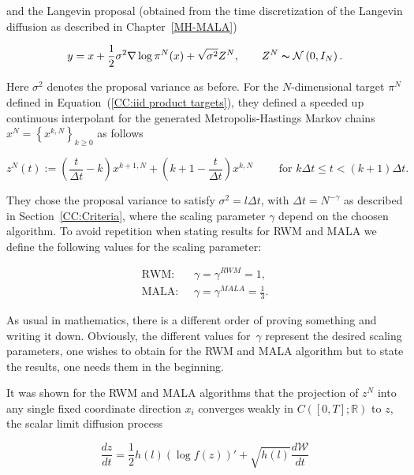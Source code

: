 and the Langevin proposal (obtained from the time discretization of the Langevin diffusion as described in Chapter~\ref{MH-MALA})

\begin{equation}
 \label{CC:MALAProposals}
 y = x + \frac{1}{2} \sigma^2 \nabla \log \pi^{N} (x) + \sqrt{\sigma^2} Z^N, \qquad Z^{N} \thicksim \mathcal{N}\left( 0,I_N \right).
\end{equation}

Here $\sigma^2 $ denotes the proposal variance as before.  For the $N$-dimensional target $\pi^{N}$ defined in Equation~(\ref{CC:iid product targets}), they defined a speeded up continuous interpolant for the generated Metropolis-Hastings Markov chains $ x^{N} = \left\{ x^{k,N}\right\}_{k \geq 0} $ as follows

\begin{equation}
\label{CC:Continuous interpolant 2}
 z^{N}(t) := \left( \frac{t}{\Delta t} -k \right) x^{k+1,N} + \left( k+1 - \frac{t}{\Delta t} \right) x^{k,N} \qquad \text{ for } k \Delta t \leq t < (k+1)\Delta t.
\end{equation}

They chose the proposal variance to satisfy $ \sigma^2 = l \Delta t $, with $ \Delta t = N^{-\gamma} $ as described in Section~\ref{CC:Criteria}, where the scaling parameter $\gamma$ depend on the choosen algorithm. To avoid repetition when stating results for RWM and MALA we define the following values for the scaling parameter:

\begin{align}
 \text{RWM: } & \; \gamma = \gamma^{RWM} = 1, \\
 \text{MALA: } & \; \gamma = \gamma^{MALA} = \frac{1}{3}.
\end{align}

As usual in mathematics, there is a different order of proving something and writing it down. Obviously, the different values for~$\gamma$ represent the desired scaling parameters, one wishes to obtain for the RWM and MALA algorithm but to state the results, one needs them in the beginning.

It was shown for the RWM and MALA algorithms that the projection of $z^{N}$ into any single fixed coordinate direction $x_i$ converges weakly in $ C \left( [0,T];\mathbb{R} \right) $ to $z$, the scalar limit diffusion process

\begin{equation}
 \label{CC:Scalar Limit Diffusion}
 \frac{dz}{dt} = \frac{1}{2} h(l) \left( \log f(z) \right)' + \sqrt{h(l)}\frac{d\mathcal{W}}{dt}
\end{equation}

